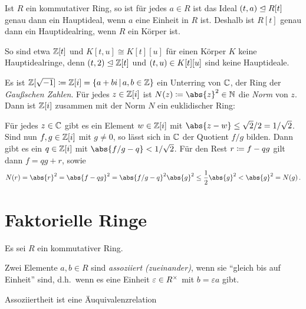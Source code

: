 \begin{remark}
  Ist $R$ ein kommutativer Ring, so ist für jedes $a \in R$ ist das Ideal $(t, a) \mathrel{\trianglelefteq} R[t]$ genau dann ein Hauptideal, wenn $a$ eine Einheit in $R$ ist.
  Deshalb ist $R[t]$ genau dann ein Hauptidealring, wenn $R$ ein Körper ist.
  
  So sind etwa $\mathbb{Z}[t]$ und $K[t,u] \cong K[t][u]$ für einen Körper $K$ keine Hauptidealringe, denn $(t, 2) \mathrel{\trianglelefteq} \mathbb{Z}[t]$ und $(t, u) \in K[t][u]$ sind keine Hauptideale.
\end{remark}

\begin{example}
  Es ist $\Integer[\sqrt{-1}] \defined \Integer[i] = \{a + bi \suchthat a, b \in \Integer\}$ ein Unterring von $\mathbb{C}$, der Ring der \emph{Gaußschen Zahlen}.
  Für jedes $z \in \mathbb{Z}[i]$ ist $N(z) \defined \abs{z}^2 \in \Natural$ die \emph{Norm} von $z$.
  Dann ist $\mathbb{Z}[i]$ zusammen mit der Norm $N$ ein euklidischer Ring:
  
  Für jedes $z \in \mathbb{C}$ gibt es ein Element $w \in \mathbb{Z}[i]$ mit $\abs{z-w} \leq \sqrt{2}/2 = 1/\sqrt{2}$.
  Sind nun $f, g \in \mathbb{Z}[i]$ mit $g \neq 0$, so lässt sich in $\mathbb{C}$ der Quotient $f/g$ bilden.
  Dann gibt es ein $q \in \mathbb{Z}[i]$ mit $\abs{f/g - q} < 1/\sqrt{2}$.
  Für den Rest $r \coloneqq f - qg$ gilt dann $f = qg + r$, sowie
  \[
          N(r)
    =     \abs{r}^2
    =     \abs{f - qg}^2
    =     \abs{f/g - q}^2 \abs{g}^2
    \leq  \frac{1}{2} \abs{g}^2
    <     \abs{g}^2
    =     N(g) \,.
  \]
\end{example}





\section{Faktorielle Ringe}

Es sei $R$ ein kommutativer Ring.

\begin{definition}
  Zwei Elemente $a, b \in R$ sind \emph{assoziiert \textup(zueinander\textup)}, wenn sie \enquote{gleich bis auf Einheit} sind, d.h.\ wenn es eine Einheit $\varepsilon \in R^{\times}$ mit $b = \varepsilon a$ gibt.
\end{definition}

\begin{lemma}
  Assoziiertheit ist eine Äuquivalenzrelation
\end{lemma}

